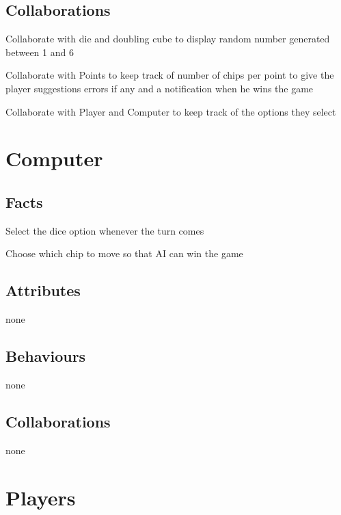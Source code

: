 \documentclass{report}
\begin{document}
\subsection{Collaborations}

    \item Collaborate with die and doubling cube to display random number generated between 1 and 6
    \item Collaborate with Points to keep track of number of chips per point to give the player suggestions errors if any and a notification when he wins the game
    \item Collaborate with Player and Computer to keep track of the options they select

\section{Computer}

\subsection{Facts}

\begin{dashed}
    \item Select the dice option whenever the turn comes
    \item Choose which chip to move so that AI can win the game
\end{dashed}

\subsection{Attributes}

    \item none

\subsection{Behaviours}

    \item none

\subsection{Collaborations}

    \item none

\section{Players}
\end{document}
